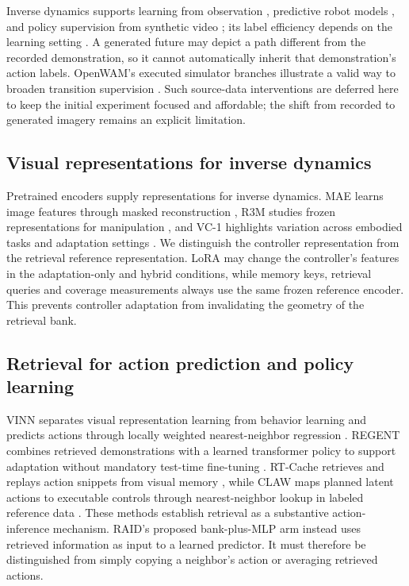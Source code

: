 \documentclass[11pt,a4paper]{article}
\begin{document}
Inverse dynamics supports learning from observation \cite{ref9}, predictive robot models \cite{ref10}, and policy supervision from synthetic video \cite{ref11}; its label efficiency depends on the learning setting \cite{ref12}. A generated future may depict a path different from the recorded demonstration, so it cannot automatically inherit that demonstration's action labels. OpenWAM's executed simulator branches illustrate a valid way to broaden transition supervision \cite{ref31}. Such source-data interventions are deferred here to keep the initial experiment focused and affordable; the shift from recorded to generated imagery remains an explicit limitation.

\subsection{Visual representations for inverse dynamics}

Pretrained encoders supply representations for inverse dynamics. MAE learns image features through masked reconstruction \cite{ref13}, R3M studies frozen representations for manipulation \cite{ref14}, and VC-1 highlights variation across embodied tasks and adaptation settings \cite{ref15}. We distinguish the controller representation from the retrieval reference representation. LoRA may change the controller's features in the adaptation-only and hybrid conditions, while memory keys, retrieval queries and coverage measurements always use the same frozen reference encoder. This prevents controller adaptation from invalidating the geometry of the retrieval bank.

\subsection{Retrieval for action prediction and policy learning}

VINN separates visual representation learning from behavior learning and predicts actions through locally weighted nearest-neighbor regression \cite{ref3}. REGENT combines retrieved demonstrations with a learned transformer policy to support adaptation without mandatory test-time fine-tuning \cite{ref16}. RT-Cache retrieves and replays action snippets from visual memory \cite{ref17}, while CLAW maps planned latent actions to executable controls through nearest-neighbor lookup in labeled reference data \cite{ref18}. These methods establish retrieval as a substantive action-inference mechanism. RAID's proposed bank-plus-MLP arm instead uses retrieved information as input to a learned predictor. It must therefore be distinguished from simply copying a neighbor's action or averaging retrieved actions.
\end{document}
